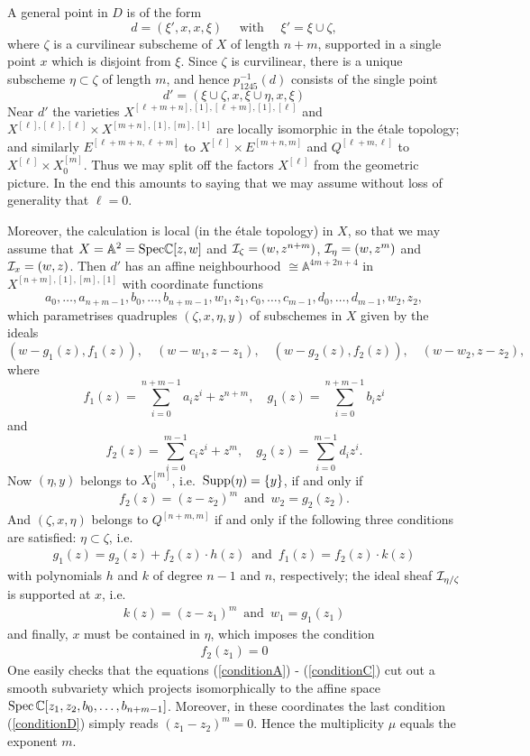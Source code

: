 \documentclass[twoside,11pt]{article}
\newcommand{\beeq}[1]{\begin{eqnarray}\label{#1}}
\newcommand{\eneq}{\end{eqnarray}}
\newcommand{\ki}{{\cal I}}
\newcommand{\IA}{{\mathbb A}}
\newcommand{\IC}{{\mathbb C}}
\newcommand{\isom}{\cong}
\newcommand{\Supp}{{\rm Supp}}
\newcommand{\Spec}{{\rm Spec}}
\begin{document}
A general point in $D$ is of the form
$$d=(\xi',x,x,\xi)\quad\mbox{ with }\quad\xi'=\xi\cup\zeta,$$
where $\zeta$ is a curvilinear subscheme of $X$ of length $n+m$, supported
in a single point $x$ which is disjoint from $\xi$.
Since $\zeta$ is curvilinear, there is a unique subscheme $\eta\subset\zeta$
of length $m$, and hence $p_{1245}^{-1}(d)$ consists of the single point
$$d'=(\xi\cup\zeta,x,\xi\cup\eta,x,\xi)$$
Near $d'$ the varieties $X^{[\ell+m+n],[1],[\ell+m],[1],[\ell]}$ and 
$X^{[\ell],[\ell],[\ell]}\times X^{[m+n],[1],[m],[1]}$ are locally isomorphic
in the \'etale topology;
and similarly $E^{[\ell+m+n,\ell+m]}$ to $X^{[\ell]}\times E^{[m+n,m]}$ and
$Q^{[\ell+m,\ell]}$ to $X^{[\ell]}\times X^{[m]}_0$. Thus we may split off the
factors $X^{[\ell]}$ from the geometric picture. In the end this amounts
to saying that we may assume without loss of generality that $\ell=0$.

Moreover, the calculation is local (in the \'etale topology) in $X$, so that we may assume that $X=\IA^{2}
=\Spec\IC[z,w]$ and $\ki_\zeta=(w,z^{n+m})$, $\ki_{\eta}=(w,z^m)$ and $\ki_x=(w,z)$. Then $d'$ has an affine neighbourhood $\isom\IA^{4m+2n+4}$
in $X^{[n+m],[1],[m],[1]}$ with coordinate functions
$$a_0,\ldots,a_{n+m-1},b_0,\ldots,b_{n+m-1},w_1,z_1,c_0,\ldots,c_{m-1},d_0,
\ldots,d_{m-1},w_2,z_2,$$
which parametrises quadruples $(\zeta,x,\eta,y)$ of subschemes in $X$ given by the ideals
$$(w-g_1(z),f_1(z)),\quad (w-w_1,z-z_1),\quad (w-g_2(z),f_2(z)),\quad (w-w_2,z-z_2),$$
where
$$f_1(z)=\sum_{i=0}^{n+m-1}a_iz^i+z^{n+m},\quad
g_1(z)=\sum_{i=0}^{n+m-1}b_iz^i
$$
and
$$f_2(z)=\sum_{i=0}^{m-1}c_iz^i+z^{m},\quad
g_2(z)=\sum_{i=0}^{m-1}d_iz^i.$$
Now $(\eta,y)$ belongs to $X^{[m]}_0$, i.e.\ $\Supp(\eta)=\{y\}$, if and only if
\beeq{conditionA}
f_2(z)=(z-z_2)^m\, \mbox{ and }\, w_2=g_2(z_2).
\eneq
And $(\zeta,x,\eta)$ belongs to $Q^{[n+m,m]}$ if and only if the following
three conditions are satisfied: $\eta\subset\zeta$, i.e.
\beeq{conditionB}
g_1(z)=g_2(z)+f_2(z)\cdot h(z)\,\mbox{ and }\,f_1(z)=f_2(z)\cdot k(z)
\eneq
with polynomials $h$ and $k$ of degree $n-1$ and $n$, respectively;
the ideal sheaf $\ki_{\eta/\zeta}$ is supported at $x$, i.e.\
\beeq{conditionC}
k(z)=(z-z_1)^m\,\mbox{ and }\, w_1=g_1(z_1)
\eneq
and finally, $x$ must be contained in $\eta$, which imposes the condition
\beeq{conditionD}
f_2(z_1)=0
\eneq
One easily checks that the equations (\ref{conditionA}) - (\ref{conditionC})
cut out a smooth subvariety which projects isomorphically to the affine space
$\Spec\,\IC[z_1,z_2,b_0,\ldots,b_{n+m-1}]$. Moreover,
in these coordinates the last condition (\ref{conditionD}) simply reads  $(z_1-z_2)^m=0$. Hence the multiplicity $\mu$ equals the exponent $m$.   
\end{document}
